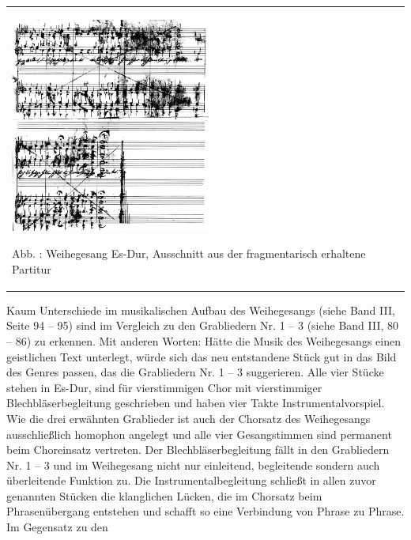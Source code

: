\documentclass[a4paper]{article}
\newcounter{Abb}
\renewcommand\theAbb{\arabic{Abb}}
\begin{document}
\begin{center}
\begin{minipage}{6.969cm}
\begin{center}
\tablefirsthead{}
\tablehead{}
\tabletail{}
\tablelasttail{}
\begin{supertabular}{m{6.769cm}}

\includegraphics[width=6.588cm,height=7.084cm]{pictures/zulassungsarbeit-img102.png}

Abb. \stepcounter{Abb}{\theAbb}: Weihegesang Es-Dur, Ausschnitt aus der
fragmentarisch erhaltene Partitur\\
\end{supertabular}
\end{center}
\end{minipage}
\end{center}
Kaum Unterschiede im musikalischen Aufbau des Weihegesangs (siehe Band
III, Seite 94 – 95) sind im Vergleich zu den Grabliedern Nr. 1 – 3
(siehe Band III, 80 – 86) zu erkennen. Mit anderen Worten: Hätte die
Musik des Weihegesangs einen geistlichen Text unterlegt, würde sich das
neu entstandene Stück gut in das Bild des Genres passen, das die
Grabliedern Nr. 1 – 3 suggerieren. Alle vier Stücke stehen in Es-Dur,
sind für vierstimmigen Chor mit vierstimmiger Blechbläserbegleitung
geschrieben und haben vier Takte Instrumentalvorspiel. Wie die drei
erwähnten Grablieder ist auch der Chorsatz des Weihegesangs
ausschließlich homophon angelegt und alle vier Gesangstimmen sind
permanent beim Choreinsatz vertreten. Der Blechbläserbegleitung fällt
in den Grabliedern Nr. 1 – 3 und im Weihegesang nicht nur einleitend,
begleitende sondern auch überleitende Funktion zu. Die
Instrumentalbegleitung schließt in allen zuvor genannten Stücken die
klanglichen Lücken, die im Chorsatz beim Phrasenübergang entstehen und
schafft so eine Verbindung von Phrase zu Phrase. Im Gegensatz zu den
\end{document}
